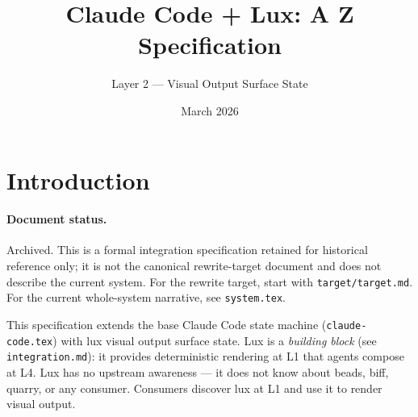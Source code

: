 \documentclass[a4paper,10pt,fleqn]{article}
\begin{document}
\begin{center}
\end{center}
\vspace{0.5em}

\title{Claude Code + Lux: A Z Specification}
\author{Layer 2 --- Visual Output Surface State}
\date{March 2026}
\maketitle

\tableofcontents
\newpage

\section{Introduction}

\paragraph{Document status.}
Archived. This is a formal integration specification retained for historical
reference only; it is not the canonical rewrite-target document and does not
describe the current system. For the rewrite target, start with
\texttt{target/target.md}. For the current whole-system narrative, see
\texttt{system.tex}.

This specification extends the base Claude Code state machine
(\texttt{claude-code.tex}) with lux visual output surface state.
Lux is a \emph{building block} (see \texttt{integration.md}): it
provides deterministic rendering at L1 that agents compose at L4.
Lux has no upstream awareness --- it does not know about beads,
biff, quarry, or any consumer. Consumers discover lux at L1 and
use it to render visual output.
\end{document}
